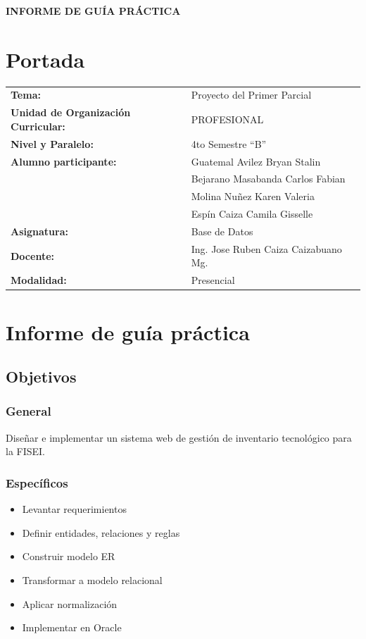 \documentclass{article}
\begin{document}
\begin{center}
    {\large \textbf{INFORME DE GUÍA PRÁCTICA}} \\    
\end{center}

\section{Portada}
\begin{flushleft}
\begin{tabular}{>{\bfseries}p{6.2cm} p{8.5cm}}
Tema: & Proyecto del Primer Parcial \\
Unidad de Organización Curricular: & PROFESIONAL \\
Nivel y Paralelo: & 4to Semestre ``B'' \\
Alumno participante: & Guatemal Avilez Bryan Stalin \\
& Bejarano Masabanda Carlos Fabian \\
& Molina Nuñez Karen Valeria \\
& Espín Caiza Camila Gisselle \\

Asignatura: & Base de Datos \\
Docente: & Ing. Jose Ruben Caiza Caizabuano Mg. \\
Modalidad: & Presencial \\
\end{tabular}
\end{flushleft}


\section{Informe de guía práctica}
\subsection{Objetivos}
\subsubsection{General}
Diseñar e implementar un sistema web de gestión de inventario tecnológico para la FISEI.
\subsubsection{Específicos}
\begin{itemize}
    \item Levantar requerimientos
    \item Definir entidades, relaciones y reglas
    \item Construir modelo ER
    \item Transformar a modelo relacional
    \item Aplicar normalización
    \item Implementar en Oracle
\end{itemize}
\end{document}
